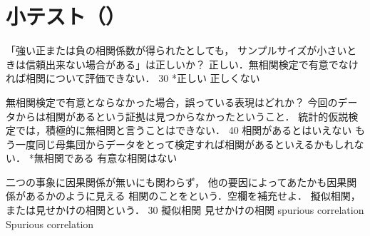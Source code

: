\newcommand{\Release}{}
\newcommand{\Slide}{}
\newcommand{\PrintLecture}{1}
\newcommand{\PrintSolution}{1}







\section{小テスト（\MyClass）}

\begin{quiz}{\MyClass}

\QuizTrueFalse
{「強い正または負の相関係数が得られたとしても，
サンプルサイズが小さいときは信頼出来ない場合がある」は正しいか？}
{正しい．無相関検定で有意でなければ相関について評価できない．}
{30}
{*正しい}
{正しくない}

\QuizMultipleChoices
{無相関検定で有意とならなかった場合，誤っている表現はどれか？}
{
  今回のデータからは相関があるという証拠は見つからなかったということ．
  統計的仮説検定では，積極的に無相関と言うことはできない．
}
{40}
{相関があるとはいえない}
{もう一度同じ母集団からデータをとって検定すれば相関があるといえるかもしれない．}
{*無相関である}
{有意な相関はない}

\QuizShortAnswer
{
    二つの事象に因果関係が無いにも関わらず，
    他の要因によってあたかも因果関係があるかのように見える
    相関のことを\MyFill{　　　　}という．空欄を補充せよ．
}
{
  擬似相関，または見せかけの相関という．
}
{30}
{擬似相関}
{見せかけの相関}
{spurious correlation}
{Spurious correlation}

\end{quiz}


